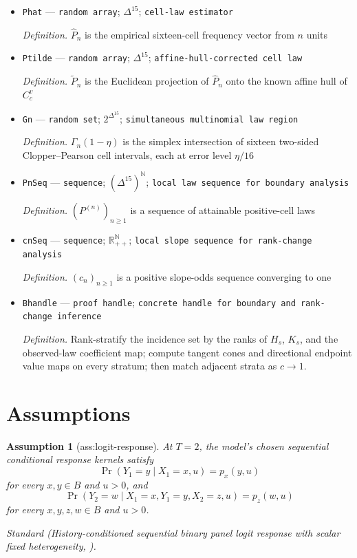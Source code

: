 \documentclass{article}
\newtheorem{assumption}{Assumption}
\begin{document}
\begin{itemize}
  \item \texttt{Phat} --- \texttt{random array}; \(\Delta^{15}\); \texttt{cell-\allowbreak{}law estimator}
  \par\smallskip\noindent\emph{Definition.} \(\widehat P_n\) is the empirical sixteen-cell frequency vector from \(n\) units
  \item \texttt{Ptilde} --- \texttt{random array}; \(\Delta^{15}\); \texttt{affine-\allowbreak{}hull-\allowbreak{}corrected cell law}
  \par\smallskip\noindent\emph{Definition.} \(\widetilde P_n\) is the Euclidean projection of \(\widehat P_n\) onto the known affine hull of \(C_c^v\)
  \item \texttt{Gn} --- \texttt{random set}; \(2^{\Delta^{15}}\); \texttt{simultaneous multinomial law region}
  \par\smallskip\noindent\emph{Definition.} \(\Gamma_n(1-\eta)\) is the simplex intersection of sixteen two-sided Clopper--Pearson cell intervals, each at error level \(\eta/16\)
  \item \texttt{PnSeq} --- \texttt{sequence}; \((\Delta^{15})^{\mathbb N}\); \texttt{local law sequence for boundary analysis}
  \par\smallskip\noindent\emph{Definition.} \((P^{(n)})_{n\ge1}\) is a sequence of attainable positive-cell laws
  \item \texttt{cnSeq} --- \texttt{sequence}; \(\mathbb R_{++}^{\mathbb N}\); \texttt{local slope sequence for rank-\allowbreak{}change analysis}
  \par\smallskip\noindent\emph{Definition.} \((c_n)_{n\ge1}\) is a positive slope-odds sequence converging to one
  \item \texttt{Bhandle} --- \texttt{proof handle}; \texttt{concrete handle for boundary and rank-\allowbreak{}change inference}
  \par\smallskip\noindent\emph{Definition.} Rank-stratify the incidence set by the ranks of \(H_s\), \(K_s\), and the observed-law coefficient map; compute tangent cones and directional endpoint value maps on every stratum; then match adjacent strata as \(c\to1\).
\end{itemize}

\section{Assumptions}

\begin{assumption}[ass:logit-response]\label{ass:logit-response}
At \(T=2\), the model's chosen sequential conditional response kernels satisfy
\[
 \Pr(Y_1=y\mid X_1=x,u)=p_x(y,u)
\]
for every \(x,y\in B\) and \(u>0\), and
\[
 \Pr(Y_2=w\mid X_1=x,Y_1=y,X_2=z,u)=p_z(w,u)
\]
for every \(x,y,z,w\in B\) and \(u>0\).
\par\smallskip\noindent\emph{Standard} (History-conditioned sequential binary panel logit response with scalar fixed heterogeneity, \cite{bonhommeDanoGraham2023}).
\end{assumption}
\end{document}
